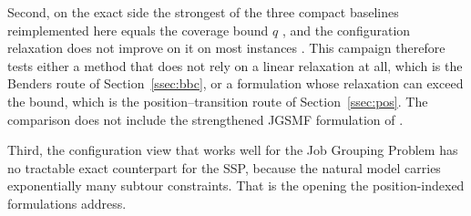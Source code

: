 Second, on the exact side the strongest of the three compact baselines reimplemented
here equals the coverage bound $q$ \citep{daSilva2024}, and the configuration
relaxation does not improve on it on most instances \citep{Moreira2026}. This campaign
therefore tests either a method that
does not rely on a linear relaxation at all, which is the Benders route of
Section~\ref{ssec:bbc}, or a formulation whose relaxation can exceed the bound, which
is the position--transition route of Section~\ref{ssec:pos}. The comparison does not
include the strengthened JGSMF formulation of \citet{Akhundov2024}.

Third, the configuration view that works well for the Job Grouping Problem
\citep{Otiai2026} has no tractable exact counterpart for the SSP, because the natural
model carries exponentially many subtour constraints. That is the opening the
position-indexed formulations address.
